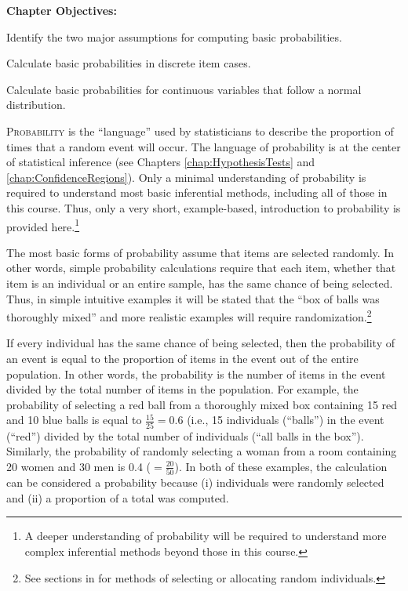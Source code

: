 \documentclass[10pt,openany]{book}\usepackage[]{graphicx}\usepackage[]{color}
\begin{document}
\begin{ChapObj}{\boxwidth}
  \textbf{Chapter Objectives:}
  \begin{Enumerate}
    \item Identify the two major assumptions for computing basic probabilities.
    \item Calculate basic probabilities in discrete item cases.
    \item Calculate basic probabilities for continuous variables that follow a normal distribution.
  \end{Enumerate}
\end{ChapObj}


\lettrine{P}{robability} is the ``language'' used by statisticians to describe the proportion of times that a random event will occur.  The language of probability is at the center of statistical inference (see Chapters \ref{chap:HypothesisTests} and \ref{chap:ConfidenceRegions}). Only a minimal understanding of probability is required to understand most basic inferential methods, including all of those in this course.  Thus, only a very short, example-based, introduction to probability is provided here.\footnote{A deeper understanding of probability will be required to understand more complex inferential methods beyond those in this course.}

The most basic forms of probability assume that items are selected randomly.  In other words, simple probability calculations require that each item, whether that item is an individual or an entire sample, has the same chance of being selected.  Thus, in simple intuitive examples it will be stated that the ``box of balls was thoroughly mixed'' and more realistic examples will require randomization.\footnote{See sections in  for methods of selecting or allocating random individuals.}


If every individual has the same chance of being selected, then the probability of an event is equal to the proportion of items in the event out of the entire population.  In other words, the probability is the number of items in the event divided by the total number of items in the population.  For example, the probability of selecting a red ball from a thoroughly mixed box containing 15 red and 10 blue balls is equal to $\frac{15}{25}=0.6$ (i.e., 15 individuals (``balls'') in the event (``red'') divided by the total number of individuals (``all balls in the box'').  Similarly, the probability of randomly selecting a woman from a room containing 20 women and 30 men is 0.4 ($=\frac{20}{50}$).  In both of these examples, the calculation can be considered a probability because (i) individuals were randomly selected and (ii) a proportion of a total was computed.
\end{document}
